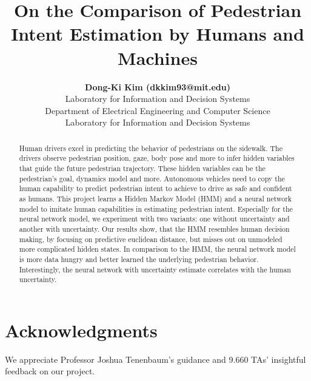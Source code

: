 \documentclass[10pt,letterpaper]{article}
\title{On the Comparison of Pedestrian Intent Estimation by Humans and Machines}
\author{{\large \bf Dong-Ki Kim (dkkim93@mit.edu)} \\
  Laboratory for Information and Decision Systems 
  \AND {\large \bf Rose E. Wang (rewang@mit.edu)} \\
  Department of Electrical Engineering and Computer Science
  \AND {\large \bf Bj\"orn L\"utjens (lutjens@mit.edu)} \\
  Laboratory for Information and Decision Systems}
\begin{document}
\maketitle

\begin{abstract}
Human drivers excel in predicting the behavior of pedestrians on the sidewalk. The drivers observe pedestrian position, gaze, body pose and more to infer hidden variables that guide the future pedestrian trajectory. These hidden variables can be the pedestrian's goal, dynamics model and more. Autonomous vehicles need to copy the human capability to predict pedestrian intent to achieve to drive as safe and confident as humans. This project learns a Hidden Markov Model (HMM) and a neural network model to imitate human capabilities in estimating pedestrian intent. Especially for the neural network model, we experiment with two variants: one without uncertainty and another with uncertainty. Our results show, that the HMM resembles human decision making, by focusing on predictive euclidean distance, but misses out on unmodeled more complicated hidden states. In comparison to the HMM, the neural network model is more data hungry and better learned the underlying pedestrian behavior. Interestingly, the neural network with uncertainty estimate correlates with the human uncertainty.
\end{abstract}







\section{Acknowledgments}

We appreciate Professor Joshua Tenenbaum's guidance and 9.660 TAs' insightful feedback on our project.

\newpage

\setlength{\bibleftmargin}{.125in}
\setlength{\bibindent}{-\bibleftmargin}

\end{document}
